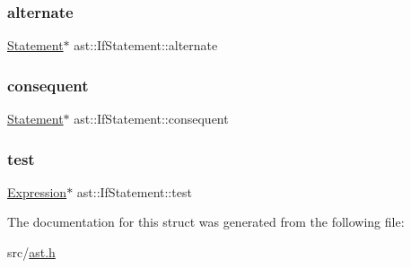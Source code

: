 \subsubsection{\texorpdfstring{alternate}{alternate}}
{\footnotesize\ttfamily \hyperlink{structast_1_1_statement}{Statement}$\ast$ ast\+::\+If\+Statement\+::alternate}

\mbox{\label{structast_1_1_if_statement_a2a02f92cb28fb4847ea286341c1c0270}} 
\subsubsection{\texorpdfstring{consequent}{consequent}}
{\footnotesize\ttfamily \hyperlink{structast_1_1_statement}{Statement}$\ast$ ast\+::\+If\+Statement\+::consequent}

\mbox{\label{structast_1_1_if_statement_ad339145ed98fc65452bc7339f737a790}} 
\subsubsection{\texorpdfstring{test}{test}}
{\footnotesize\ttfamily \hyperlink{structast_1_1_expression}{Expression}$\ast$ ast\+::\+If\+Statement\+::test}



The documentation for this struct was generated from the following file\+:\begin{DoxyCompactItemize}
\item 
src/\hyperlink{ast_8h}{ast.\+h}\end{DoxyCompactItemize}
